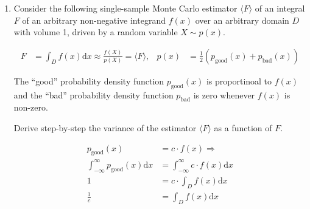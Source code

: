 \documentclass[10pt,\jkfside,a4paper]{article}
\begin{document}
\begin{enumerate}
\begin{enumerate}
\begin{lstlisting}[escapeinside={'*}{*'}]
vector illumination(vector '*$\mathbf{x}$*', vector '*$\mathbf{x}'$*'){
	n = ...
	light = 0;
	for (int i = 0; i < n; i++{
		'*$\theta$*' = 2 * '*$\pi$*' * RAND();
		'*$\phi$*' = '*$\frac{\pi}{2}$*' * RAND();
		'*$\mathbf{y}$*' = '*$\begin{pmatrix} \sin\theta\cos\phi \\ \sin\theta\sin\phi \\ \cos\theta \\ \end{pmatrix}$*';
		if (intercepts_E('*$\mathbf{x} + \lambda\mathbf{y}$*')){
			light += '*$L_e$*' * '*$\cos\theta$*';
		}
	}
	return light / n * '*$\frac{\mathbf{x}}{|\mathbf{x}|}\cdot \begin{pmatrix} 0 \\ 1 \\ 0\\ \end{pmatrix}$*';
}
\end{lstlisting}

\end{enumerate}

\item Consider the following single-sample Monte Carlo estimator
$\langle F \rangle$ of an integral $F$ of an arbitrary non-negative integrand
$f(x)$ over an arbitrary domain $D$ with volume 1, driven by a random
variable $X\sim p(x)$.

\begin{align*}
F &= \int_D f(x)\text{d}x \approx \frac{f(X)}{p(X)} = \langle F \rangle, &
p(x) &= \frac{1}{2}\left( p_{\text{good}}(x) + p_{\text{bad}}(x) \right)
\end{align*}

The ``good'' probability density function $p_{\text{good}}(x)$ is
proportinoal to $f(x)$ and the ``bad'' probability density function
$p_{\text{bad}}$ is zero whenever $f(x)$ is non-zero.

Derive step-by-step the variance of the estimator $ \langle F \rangle $ as a
function of $F$.

\[
\begin{split}
p_{\text{good}}(x) &= c \cdot f(x) \Longrightarrow \\
\int^{\infty}_{-\infty} p_{\text{good}}(x) \text{d}x &=
\int^{\infty}_{-\infty} c \cdot f(x) \text{d}x \\
1 &= c \cdot \int_D f(x) \text{d}{x} \\
\frac{1}{c} &= \int_D f(x) \text{d}{x} \\
\end{split}
\]


\end{enumerate}
\end{document}
